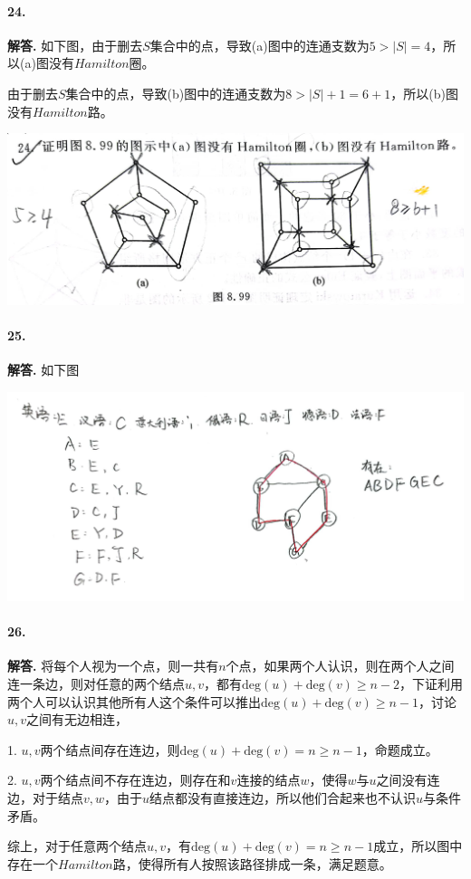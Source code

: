 \documentclass[12pt, a4paper, oneside]{ctexart}
\newenvironment{solution}{\par\noindent\textbf{解答. }}{\bigskip\par}
\begin{document}
\paragraph{24.}\begin{solution}
    如下图，由于删去$S$集合中的点，导致(a)图中的连通支数为$5 > |S| = 4$，所以(a)图没有$Hamilton$圈。

    由于删去$S$集合中的点，导致(b)图中的连通支数为$8 > |S|+1 = 6+1$，所以(b)图没有$Hamilton$路。

    \centerline{
        \includegraphics[width=1\textwidth]{graph2.jpg}
    }
\end{solution}
\paragraph{25.}\begin{solution}
    如下图

    \centerline{
        \includegraphics[width=1\textwidth]{graph3.jpg}
    }
\end{solution}
\paragraph{26.}\begin{solution}
    将每个人视为一个点，则一共有$n$个点，如果两个人认识，则在两个人之间连一条边，则对任意的两个结点$u,v$，都有$\text{deg}(u)+\text{deg}(v) \geqslant n-2$，下证利用两个人可以认识其他所有人这个条件可以推出$\text{deg}(u)+\text{deg}(v)\geqslant n-1$，讨论$u,v$之间有无边相连，

    1. $u,v$两个结点间存在连边，则$\text{deg}(u)+\text{deg}(v)=n\geqslant n-1$，命题成立。

    2. $u,v$两个结点间不存在连边，则存在和$v$连接的结点$w$，使得$w$与$u$之间没有连边，对于结点$v,w$，由于$u$结点都没有直接连边，所以他们合起来也不认识$u$与条件矛盾。

    综上，对于任意两个结点$u,v$，有$\text{deg}(u)+\text{deg}(v)=n\geqslant n-1$成立，所以图中存在一个$Hamilton$路，使得所有人按照该路径排成一条，满足题意。
\end{solution}
\end{document}

